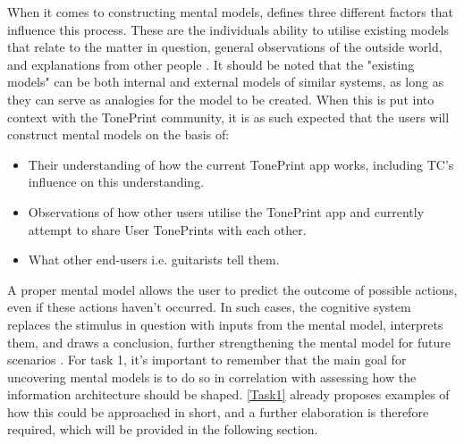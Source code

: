 \noindent
When it comes to constructing mental models, \textcite{PDF:MentalModelInstructions} defines three different factors that influence this process. These are the individuals ability to utilise existing models that relate to the matter in question, general observations of the outside world, and explanations from other people \parencite[][68-69]{PDF:MentalModelInstructions}. It should be noted that the "existing models" can be both internal and external models of similar systems, as long as they can serve as analogies for the model to be created. When this is put into context with the TonePrint community, it is as such expected that the users will construct mental models on the basis of:
%
\begin{itemize}
	\item Their understanding of how the current TonePrint app works, including TC's influence on this understanding.
	\item Observations of how other users utilise the TonePrint app and currently attempt to share User TonePrints with each other.
	\item What other end-users i.e. guitarists tell them.
\end{itemize}
%
A proper mental model allows the user to predict the outcome of possible actions, even if these actions haven't occurred. In such cases, the cognitive system replaces the stimulus in question with inputs from the mental model, interprets them, and draws a conclusion, further strengthening the mental model for future scenarios \parencite[][64]{PDF:MentalModelInstructions}. For task 1, it's important to remember that the main goal for uncovering mental models is to do so in correlation with assessing how the information architecture should be shaped. \autoref{Task1} already proposes examples of how this could be approached in short, and a further elaboration is therefore required, which will be provided in the following section.

